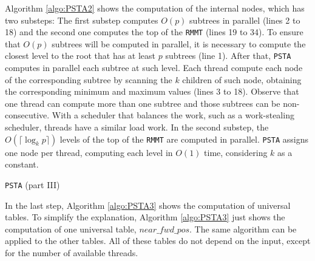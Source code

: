 	Algorithm \ref{algo:PSTA2} shows the computation of the internal nodes, which has two substeps: The first substep computes $O(p)$ subtrees in parallel (lines 2 to 18) and the second one computes the top of the {\tt RMMT} (lines 19 to 34). To ensure that $O(p)$ subtrees will be computed in parallel, it is necessary to compute the closest level to the root that has at least $p$ subtrees (line 1). After that, {\tt PSTA} computes in parallel each subtree at such level. Each thread compute each node of the corresponding subtree by scanning the $k$ children of such node, obtaining the corresponding minimum and maximum values (lines 3 to 18). Observe that one thread can compute more than one subtree and those subtrees can be non-consecutive. With a scheduler that balances the work, such as a work-stealing scheduler, threads have a similar load work. In the second substep, the $O(\lceil \log_{k}p \rceil)$ levels of the top of the {\tt RMMT} are computed in parallel. {\tt PSTA} assigns one node per thread, computing each level in $O(1)$ time, considering $k$ as a constant.


\begin{algorithm}[t]
\small
\SetVlineSkip{-2cm}
  \LinesNumbered
  \SetAlgoNoEnd
  \DontPrintSemicolon
  \BlankLine%


  \caption{{\tt PSTA} (part III)}
  \label{algo:PSTA3}
\end{algorithm}
\normalsize

 In the last step, Algorithm \ref{algo:PSTA3} shows the computation of universal tables. To simplify the explanation, Algorithm \ref{algo:PSTA3} just shows the computation of one universal table, $near\_fwd\_pos$. The same algorithm can be applied to the other tables. All of these tables do not depend on the input, except for the number of available threads.